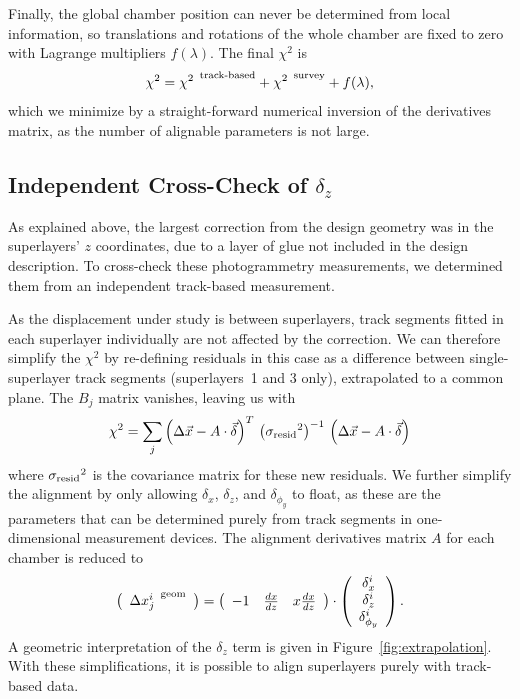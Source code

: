 Finally, the global chamber position can never be determined from
local information, so translations and rotations of the whole chamber
are fixed to zero with Lagrange multipliers $f(\lambda)$.  The final
$\chi^2$ is
\begin{equation}
\chi^2 = {\chi^2}^{\mbox{\scriptsize \, track-based}} +
{\chi^2}^{\mbox{\scriptsize \, survey}} + f(\lambda) \mbox{,}
\end{equation}
which we minimize by a straight-forward numerical inversion of the
derivatives matrix, as the number of alignable parameters is not
large.

\subsection{Independent Cross-Check of $\delta_z$}
\label{sec:standdt_independent}

As explained above, the largest correction from the design geometry
was in the superlayers' $z$ coordinates, due to a layer of glue not
included in the design description.  To cross-check these
photogrammetry measurements, we determined them from an independent
track-based measurement.

As the displacement under study is between superlayers, track segments
fitted in each superlayer individually are not affected by the
correction.  We can therefore simplify the $\chi^2$ by re-defining
residuals in this case as a difference between single-superlayer track
segments (superlayers~1 and 3 only), extrapolated to a common plane.
The $B_j$ matrix vanishes, leaving us with
\begin{equation}
\chi^2 = \sum_j \left(\Delta \vec{x} - A \cdot \vec{\delta}\right)^T \, \left({\sigma_{\mbox{\scriptsize resid}}}^2\right)^{-1} \, \left(\Delta \vec{x} - A \cdot \vec{\delta}\right)
\end{equation}
where ${\sigma_{\mbox{\scriptsize resid}}}^2$ is the covariance matrix
for these new residuals.  We further simplify the alignment by only
allowing $\delta_x$, $\delta_z$, and $\delta_{\phi_y}$ to float, as
these are the parameters that can be determined purely from track
segments in one-dimensional measurement devices.  The alignment
derivatives matrix $A$ for each chamber is reduced to
\begin{equation}
\left(\begin{array}{c} 
{\Delta x^i_j}^{\mbox{\scriptsize \, geom}} \\
\end{array}\right) = 
\left(\begin{array}{c c c c c c}
-1 & \frac{dx}{dz} & x\frac{dx}{dz}  \\
\end{array}\right)\cdot
\left(\begin{array}{c} 
\delta_x^i \\
\delta_z^i \\
\delta_{\phi_y}^i \\
\end{array}\right) \mbox{.}
\end{equation}
A geometric interpretation of the $\delta_z$ term is given in
Figure~\ref{fig:extrapolation}.  With these simplifications, it is
possible to align superlayers purely with track-based data.

